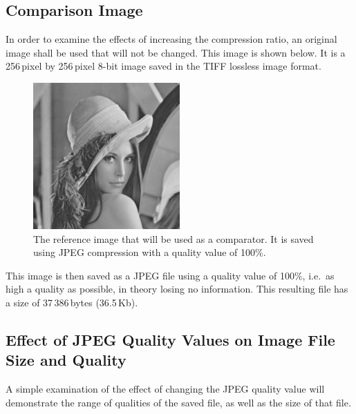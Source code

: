 \subsection{Comparison Image} %
\label{sub:comparison_image}
In order to examine the effects of increasing the compression ratio, an original image shall be used that will not be changed. This image is shown below. It is a 256\,pixel by 256\,pixel 8-bit image saved in the TIFF lossless image format.
\begin{figure}[ht]
 	\centering
 	\includegraphics[width=0.5\textwidth]{lena.jpg}
	\caption{The reference image that will be used as a comparator. It is saved using JPEG compression with a quality value of 100\%.\label{fig:orig}}
\end{figure}
This image is then saved as a JPEG file using a quality value of 100\%, i.e.\ as high a quality as possible, in theory losing no information. This resulting file has a size of 37\,386\,bytes (36.5\,Kb). 

\subsection{Effect of JPEG Quality Values on Image File Size and Quality} %
\label{sub:effect_of_jpeg_quality_values_on_image_file_size_and_quality}
A simple examination of the effect of changing the JPEG quality value will demonstrate the range of qualities of the saved file, as well as the size of that file.

